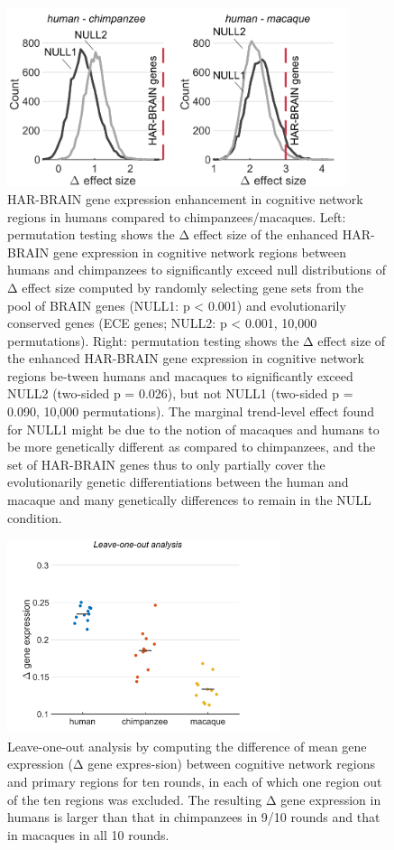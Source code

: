 \begin{refsection}
\begin{figure}[H]
    \centering
    \includegraphics[width=10cm]{images/harFigS5.png}
    \caption{HAR-BRAIN gene expression enhancement in cognitive network regions in humans compared to chimpanzees/macaques. Left: permutation testing shows the Δ effect size of the enhanced HAR-BRAIN gene expression in cognitive network regions between humans and chimpanzees to significantly exceed null distributions of Δ effect size computed by randomly selecting gene sets from the pool of BRAIN genes (NULL1: p < 0.001) and evolutionarily conserved genes (ECE genes; NULL2: p < 0.001, 10,000 permutations). Right: permutation testing shows the Δ effect size of the enhanced HAR-BRAIN gene expression in cognitive network regions be-tween humans and macaques to significantly exceed NULL2 (two-sided p = 0.026), but not NULL1 (two-sided p = 0.090, 10,000 permutations). The marginal trend-level effect found for NULL1 might be due to the notion of macaques and humans to be more genetically different as compared to chimpanzees, and the set of HAR-BRAIN genes thus to only partially cover the evolutionarily genetic differentiations between the human and macaque and many genetically differences to remain in the NULL condition.}
    \label{harFigs5}
\end{figure}

\begin{figure}[H]
    \centering
    \includegraphics[width=8cm]{images/harFigS6.png}
    \caption{Leave-one-out analysis by computing the difference of mean gene expression (Δ gene expres-sion) between cognitive network regions and primary regions for ten rounds, in each of which one region out of the ten regions was excluded. The resulting Δ gene expression in humans is larger than that in chimpanzees in 9/10 rounds and that in macaques in all 10 rounds.}
    \label{harFigs6}
\end{figure}


\end{refsection}

